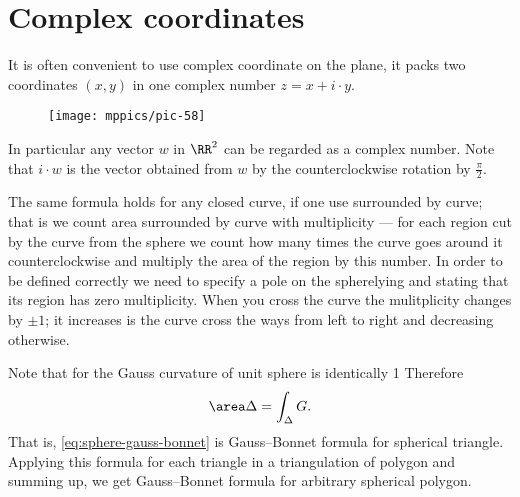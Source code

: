\section*{Complex coordinates}

It is often convenient to use complex coordinate on the plane,
it packs two coordinates $(x,y)$ in one complex number $z=x+i\cdot y$.

{

\begin{wrapfigure}{r}{20 mm}
\vskip-0mm
\centering
\texttt{[image: mppics/pic-58]}
\vskip0mm
\end{wrapfigure}

In particular any vector $w$ in $\RR^2$ can be regarded as a complex number.
Note that $i\cdot w$ is the vector obtained from $w$ by the counterclockwise rotation by $\tfrac\pi2$.

}































The same formula holds for any closed curve, if one use  surrounded by curve;
that is we count area surrounded by curve with multiplicity --- for each region cut by the curve from the sphere we count how many times the curve goes around it counterclockwise and multiply the area of the region by this number.
In order to be defined correctly we need to specify a pole on the spherelying and stating that its region has zero multiplicity. 
When you cross the curve the mulitplicity changes by $\pm1$; it increases is the curve cross the ways from left to right and decreasing otherwise.

Note that for the Gauss curvature of unit sphere is identically 1
Therefore 
\[\area\Delta=\int_\Delta G.\]
That is, \ref{eq:sphere-gauss-bonnet} is Gauss--Bonnet formula for spherical triangle.
Applying this formula for each triangle in a  triangulation of polygon and summing up, we get Gauss--Bonnet formula for arbitrary spherical polygon.

